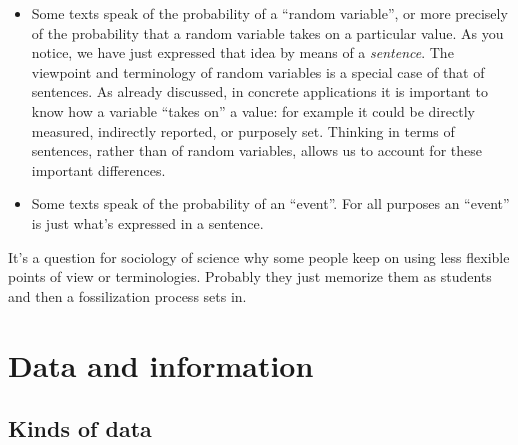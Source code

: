 \documentclass[
  a4paper,
  DIV=11,
  numbers=noendperiod,
  oneside]{scrreprt}
\begin{document}
\begin{tcolorbox}[enhanced jigsaw, colback=white, breakable, coltitle=black, bottomtitle=1mm, title={\faIcon{exclamation-circle} Differences in terminology}, leftrule=.75mm, opacitybacktitle=0.6, opacityback=0, colframe=quarto-callout-important-color-frame, colbacktitle=quarto-callout-important-color!10!white, rightrule=.15mm, arc=.35mm, titlerule=0mm, toprule=.15mm, left=2mm, toptitle=1mm, bottomrule=.15mm]

\begin{itemize}
\item
  Some texts speak of the probability of a ``random\footnotemark{}
  variable'', or more precisely of the probability that a random
  variable takes on a particular value. As you notice, we have just
  expressed that idea by means of a \emph{sentence}. The viewpoint and
  terminology of random variables is a special case of that of
  sentences. As already discussed, in concrete applications it is
  important to know how a variable ``takes on'' a value: for example it
  could be directly measured, indirectly reported, or purposely set.
  Thinking in terms of sentences, rather than of random variables,
  allows us to account for these important differences.
\item
  Some texts speak of the probability of an ``event''. For all purposes
  an ``event'' is just what's expressed in a sentence.
\end{itemize}

It's a question for sociology of science why some people keep on using
less flexible points of view or terminologies. Probably they just
memorize them as students and then a fossilization process sets in.

\end{tcolorbox}


\hypertarget{data-and-information}{%
\chapter{Data and information}\label{data-and-information}}

\hypertarget{kinds-of-data}{%
\section{Kinds of data}\label{kinds-of-data}}
\end{document}
